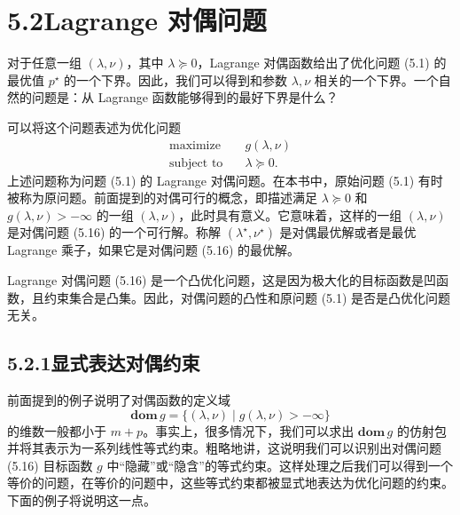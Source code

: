 \documentclass[UTF8, 12pt, fontset=fandol, oneside]{ctexart}
\begin{document}
\section*{5.2\quad Lagrange 对偶问题}

对于任意一组 $(\lambda,\nu)$，其中 $\lambda\succeq 0$，Lagrange 对偶函数给出了优化问题 (5.1) 的最优值 $p^\star$ 的一个下界。因此，我们可以得到和参数 $\lambda,\nu$ 相关的一个下界。一个自然的问题是：从 Lagrange 函数能够得到的最好下界是什么？

可以将这个问题表述为优化问题
\begin{equation}
\begin{aligned}
\text{maximize}\quad & g(\lambda,\nu)\\
\text{subject to}\quad & \lambda\succeq 0.
\end{aligned}
\tag{5.16}
\end{equation}
上述问题称为问题 (5.1) 的 Lagrange 对偶问题。在本书中，原始问题 (5.1) 有时被称为原问题。前面提到的对偶可行的概念，即描述满足 $\lambda\succeq 0$ 和 $g(\lambda,\nu)>-\infty$ 的一组 $(\lambda,\nu)$，此时具有意义。它意味着，这样的一组 $(\lambda,\nu)$ 是对偶问题 (5.16) 的一个可行解。称解 $(\lambda^\star,\nu^\star)$ 是对偶最优解或者是最优 Lagrange 乘子，如果它是对偶问题 (5.16) 的最优解。

Lagrange 对偶问题 (5.16) 是一个凸优化问题，这是因为极大化的目标函数是凹函数，且约束集合是凸集。因此，对偶问题的凸性和原问题 (5.1) 是否是凸优化问题无关。

\subsection*{5.2.1\quad 显式表达对偶约束}

前面提到的例子说明了对偶函数的定义域
\[
\mathbf{dom}\,g=\{(\lambda,\nu)\mid g(\lambda,\nu)>-\infty\}
\]
的维数一般都小于 $m+p$。事实上，很多情况下，我们可以求出 $\mathbf{dom}\,g$ 的仿射包并将其表示为一系列线性等式约束。粗略地讲，这说明我们可以识别出对偶问题 (5.16) 目标函数 $g$ 中``隐藏''或``隐含''的等式约束。这样处理之后我们可以得到一个等价的问题，在等价的问题中，这些等式约束都被显式地表达为优化问题的约束。下面的例子将说明这一点。
\end{document}
